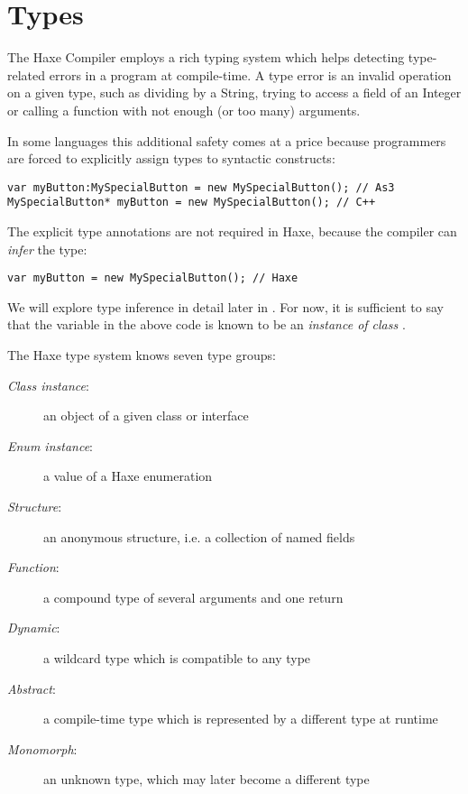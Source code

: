 \chapter{Types}
\label{types}

The Haxe Compiler employs a rich typing system which helps detecting type-related errors in a program at compile-time. A type error is an invalid operation on a given type, such as dividing by a String, trying to access a field of an Integer or calling a function with not enough (or too many) arguments.

In some languages this additional safety comes at a price because programmers are forced to explicitly assign types to syntactic constructs:

\begin{lstlisting}
var myButton:MySpecialButton = new MySpecialButton(); // As3
MySpecialButton* myButton = new MySpecialButton(); // C++ 
\end{lstlisting}
The explicit type annotations are not required in Haxe, because the compiler can \emph{infer} the type:

\begin{lstlisting}
var myButton = new MySpecialButton(); // Haxe
\end{lstlisting}
We will explore type inference in detail later in . For now, it is sufficient to say that the variable  in the above code is known to be an \emph{instance of class} . 

The Haxe type system knows seven type groups:

\begin{description}
 \item[\emph{Class instance}:] an object of a given class or interface
 \item[\emph{Enum instance}:] a value of a Haxe enumeration
 \item[\emph{Structure}:] an anonymous structure, i.e. a collection of named fields
 \item[\emph{Function}:] a compound type of several arguments and one return
 \item[\emph{Dynamic}:] a wildcard type which is compatible to any type
 \item[\emph{Abstract}:] a compile-time type which is represented by a different type at runtime
 \item[\emph{Monomorph}:] an unknown type, which may later become a different type
\end{description}

